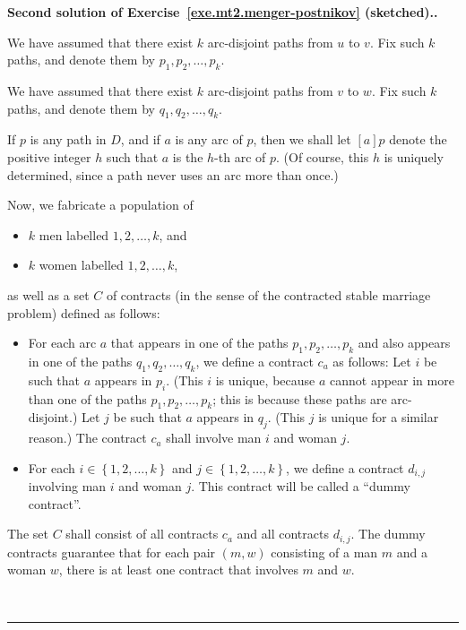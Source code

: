 \documentclass[numbers=enddot,12pt,final,onecolumn,notitlepage]{scrartcl}%
\theoremstyle{definition}
\newenvironment{proof}[1][Proof]{\noindent\textbf{#1.} }{\ \rule{0.5em}{0.5em}}
\newcommand{\set}[1]{\left\{ #1 \right\}}
\newcommand{\tup}[1]{\left( #1 \right)}
\newcommand{\ive}[1]{\left[ #1 \right]}
\begin{document}
\begin{proof}[Second solution of
Exercise~\ref{exe.mt2.menger-postnikov} (sketched).]

We have assumed that
there exist $k$ arc-disjoint paths from $u$ to $v$.
Fix such $k$ paths, and denote them by $p_1, p_2, \ldots, p_k$.

We have assumed that
there exist $k$ arc-disjoint paths from $v$ to $w$.
Fix such $k$ paths, and denote them by $q_1, q_2, \ldots, q_k$.

If $p$ is any path in $D$, and if $a$ is any arc of $p$,
then we shall let $\ive{a} p$ denote the positive integer
$h$ such that $a$ is the $h$-th arc of $p$.
(Of course, this $h$ is uniquely determined, since a path
never uses an arc more than once.)

Now, we fabricate a population of
\begin{itemize}
 \item $k$ men labelled $1, 2, \ldots, k$, and
 \item $k$ women labelled $1, 2, \ldots, k$,
\end{itemize}
as well as a set $C$ of contracts (in the sense of the
contracted stable marriage problem) defined as follows:
\begin{itemize}
 \item For each arc $a$ that appears in one of the paths
       $p_1, p_2, \ldots, p_k$ and also appears in one of
       the paths $q_1, q_2, \ldots, q_k$, we define a
       contract $c_a$ as follows:
       Let $i$ be such that $a$ appears in $p_i$.
       (This $i$ is unique, because $a$ cannot appear in
       more than one of the paths $p_1, p_2, \ldots, p_k$;
       this is because these paths are arc-disjoint.)
       Let $j$ be such that $a$ appears in $q_j$.
       (This $j$ is unique for a similar reason.)
       The contract $c_a$ shall involve man $i$ and woman
       $j$.
 \item For each $i \in \set{1, 2, \ldots, k}$ and
       $j \in \set{1, 2, \ldots, k}$, we define a contract
       $d_{i, j}$ involving man $i$ and woman $j$.
       This contract will be called a ``dummy contract''.
\end{itemize}
The set $C$ shall consist of all contracts $c_a$ and all
contracts $d_{i, j}$.
The dummy contracts guarantee that for each pair
$\tup{m, w}$ consisting of a man $m$ and a woman $w$,
there is at least one contract that involves $m$ and $w$.


\end{proof}
\end{document}
